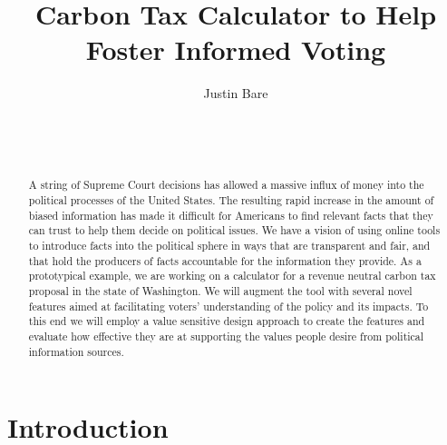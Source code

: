 \documentclass{sigchi}
\begin{document}
\title{Carbon Tax Calculator to Help Foster Informed Voting}

\author{
  \alignauthor Justin Bare\\
    \\
    \\
    \\
    \affaddr{}
}

\maketitle

\begin{abstract}
A string of Supreme Court decisions has allowed a massive influx of money into the political processes of the United States. The resulting rapid increase in the amount of biased information has made it difficult for Americans to find relevant facts that they can trust to help them decide on political issues. We have a vision of using online tools to introduce facts into the political sphere in ways that are transparent and fair, and that hold the producers of facts accountable for the information they provide. As a prototypical example, we are working on a calculator for a revenue neutral carbon tax proposal in the state of Washington. We will augment the tool with several novel features aimed at facilitating voters' understanding of the policy and its impacts. To this end we will employ a value sensitive design approach to create the features and evaluate how effective they are at supporting the values people desire from political information sources. 
\end{abstract}




\section{Introduction}
\end{document}

